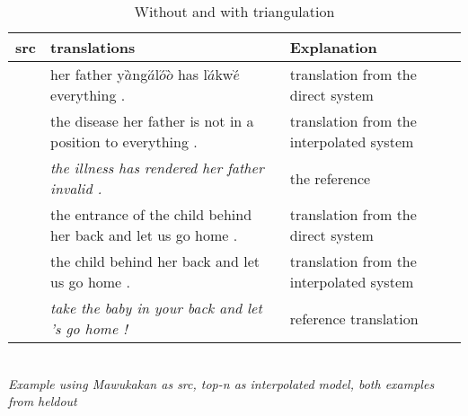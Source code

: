 \newcommand{\mawuexample}[1]{\emph{$y\grave{a}ng\acute{a}l\acute{a}\grave{a}$ w$\acute{\varepsilon}\acute{\varepsilon}$ $\grave{a}$ $\grave{a}$ l$\acute{a}$kw$\acute{e}$ k$\acute{o}\acute{o}$ b$\acute{\varepsilon}$ m$\grave{a}$ .}}

\newcommand{\anothermawu}[1]{\emph{\textipa{\!d}y$\grave{e}$n\textipa{\textltailn}$\acute{o}$ l$\grave{a}$ $\acute{i}$ kw$\acute{ɔ}$l$\grave{ɔ}$ $\acute{à}n$ d$\grave{a}$$\grave{a}$ l$\grave{u}$ m$\grave{a}$ }}

\begin{table}
	\caption{Without and with triangulation}
	\footnotesize
	\small
	\begin{tabular}{p{}p{}p{}}
	\toprule
	src & translations & Explanation \\
	\toprule
	\multirow{3}{*}{\mawuexample} 
	& her father y$\grave{a}$̀ng$\acute{a}$́l$\acute{o}$́$\grave{o}$̀ has l$\grave{a}$́kw$\grave{e}$́ everything . & translation from the direct system 
	\\ \cmidrule(r){2-3}
	&  the disease her father is not in a position to everything . & translation from the interpolated system 
	\\ \cmidrule(r){2-3}
	&  \emph{the illness has rendered her father invalid .}  & the reference 
	\\  
	\midrule
	\midrule
	\multirow{3}{*}{\anothermawu} 
	&  the entrance of the child behind her back and let us go home . & translation from the direct system \\
	\cmidrule(r){2-3}
	&  the child behind her back and let us go home . & translation from the interpolated system \\
	\cmidrule(r){2-3}
	& \emph{take the baby in your back and let 's go home !} & reference translation \\
	\bottomrule
	\end{tabular}
	\\[3.5pt]
	{\centering \emph{Example using Mawukakan as src, top-\emph{n} as interpolated model, both examples from heldout}}
	\label{table:mawu_improvement}
\end{table}


